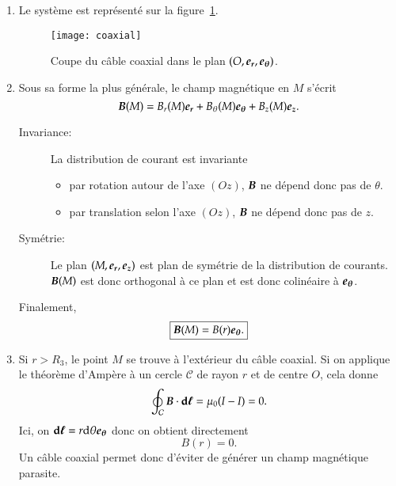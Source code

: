 \begin{corrige}
\begin{enumerate}
	\item Le système est représenté sur la figure~\ref{fig:magneto_coaxial}.
		\begin{figure}[h]
		\centering
		\texttt{[image: coaxial]}
		\caption{Coupe du câble coaxial dans le plan $(O, \er, \etheta)$.}
		\label{fig:magneto_coaxial}
	\end{figure}
	\item Sous sa forme la plus générale, le champ magnétique en $M$ 
	      s'écrit 
		      \begin{equation*}
			      \vecb(M) = B_r(M) \er + B_\theta(M) \etheta +
			      B_z(M) \ez.
		      \end{equation*}

		      \begin{description}
			     \item[Invariance:] La distribution de courant est 
			     invariante
			     \begin{itemize}
			     	\item par rotation autour de l'axe $(Oz)$, 
			     	      $\vecb$ ne dépend donc pas de $\theta$.
				\item par translation selon l'axe $(Oz)$, $\vecb$
				      ne dépend donc pas de $z$.
			     \end{itemize}
			      \item[Symétrie: ]
			      Le plan $(M, \er, \ez)$ est plan 
			      de symétrie de la distribution de 
			      courants. $\vecb(M)$ est donc 
			      orthogonal à ce plan et est donc colinéaire à
			      $\etheta$.
		      \end{description}
		     Finalement,
		     \begin{equation*}
			     \boxed{\vecb(M) = B(r) \etheta.}
		     \end{equation*}
	
	  \item Si $r > R_3$, le point $M$ se trouve à l'extérieur du câble 
		coaxial. Si on applique le théorème d'Ampère à un cercle 
		$\mathcal{C}$ de rayon $r$ et de centre $O$, cela donne
		\begin{equation*}
			\oint_\mathcal{C} \vecb \cdot \dl = \mu_0(I - I) = 0.
		\end{equation*}
		Ici, on $\dl = r \dtheta \etheta$ donc on obtient directement 
		\begin{equation*}
			\boxed{B(r) = 0}.
		\end{equation*}
		 Un câble 
		coaxial permet donc d'éviter de générer un champ magnétique parasite.


\end{enumerate}
\end{corrige}
